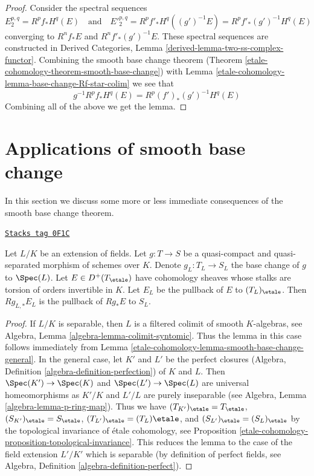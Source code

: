 \begin{proof}
Consider the spectral sequences
$$
E_2^{p, q} = R^pf_*H^q(E)
\quad\text{and}\quad
{E'}_2^{p, q} = R^pf'_*H^q((g')^{-1}E) = R^pf'_*(g')^{-1}H^q(E)
$$
converging to $R^nf_*E$ and $R^nf'_*(g')^{-1}E$.
These spectral sequences are constructed in
Derived Categories, Lemma \ref{derived-lemma-two-ss-complex-functor}.
Combining the smooth base change theorem
(Theorem \ref{etale-cohomology-theorem-smooth-base-change})
with Lemma \ref{etale-cohomology-lemma-base-change-Rf-star-colim} we see that
$$
g^{-1}R^pf_*H^q(E) = R^p(f')_*(g')^{-1}H^q(E)
$$
Combining all of the above we get the lemma.
\end{proof}

\section{Applications of smooth base change}
\label{etale-cohomology-section-applications-smooth-base-change}
In this section we discuss some more or less immediate
consequences of the smooth base change theorem.

\begin{lemma}
\label{etale-cohomology-lemma-base-change-field-extension}
\href{https://stacks.math.columbia.edu/tag/0F1C}{\texttt{Stacks tag 0F1C}}

Let $L/K$ be an extension of fields. Let $g : T \to S$ be a quasi-compact
and quasi-separated morphism of schemes over $K$. Denote
$g_L : T_L \to S_L$ the base change of $g$ to $\Spec(L)$.
Let $E \in D^+(T_\etale)$ have cohomology sheaves whose stalks
are torsion of orders invertible in $K$. Let $E_L$ be the
pullback of $E$ to $(T_L)_\etale$. Then
$Rg_{L, *}E_L$ is the pullback of $Rg_*E$ to $S_L$.
\end{lemma}

\begin{proof}
If $L/K$ is separable, then $L$ is a filtered colimit of smooth
$K$-algebras, see
Algebra, Lemma \ref{algebra-lemma-colimit-syntomic}.
Thus the lemma in this case follows immediately from
Lemma \ref{etale-cohomology-lemma-smooth-base-change-general}.
In the general case, let $K'$ and $L'$ be the perfect closures
(Algebra, Definition \ref{algebra-definition-perfection})
of $K$ and $L$. Then $\Spec(K') \to \Spec(K)$ and
$\Spec(L') \to \Spec(L)$ are universal homeomorphisms
as $K'/K$ and $L'/L$ are purely inseparable
(see Algebra, Lemma \ref{algebra-lemma-p-ring-map}).
Thus we have $(T_{K'})_\etale = T_\etale$,
$(S_{K'})_\etale = S_\etale$,
$(T_{L'})_\etale = (T_L)\etale$, and
$(S_{L'})_\etale = (S_L)_\etale$ by
the topological invariance of \'etale cohomology, see
Proposition \ref{etale-cohomology-proposition-topological-invariance}.
This reduces the lemma to the case of the field
extension $L'/K'$ which is separable (by definition of
perfect fields, see Algebra, Definition \ref{algebra-definition-perfect}).
\end{proof}

